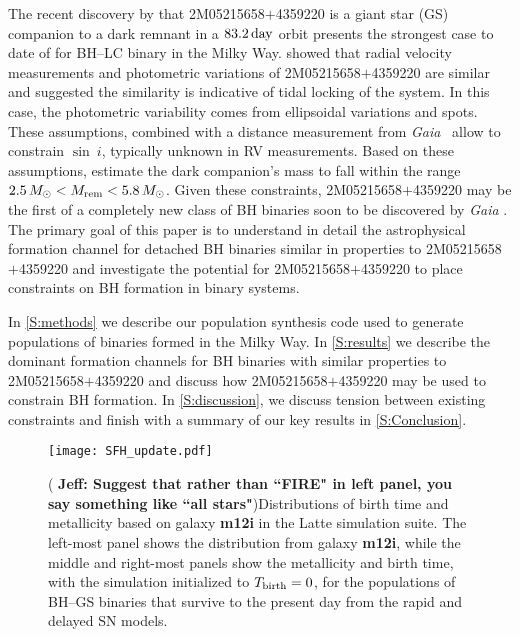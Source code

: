 \documentclass[twocolumn,tighten]{aastex61}
\newcommand{\msun}{{M_\odot}}
\newcommand{\gaia}{{\it Gaia} }
\newcommand{\days}{\rm{day}}
\newcommand{\jeff}[1]{\textbf{\color{teal} Jeff: #1}}
\begin{document}
The recent discovery by \citet{Thompson2018} that 2M05215658$+$4359220 is a giant star (GS) companion to a dark remnant in a $83.2\,\days$ orbit presents the strongest case to date of for BH--LC binary in the Milky Way. \citet{Thompson2018} showed that radial velocity measurements and photometric variations of 2M05215658$+$4359220 are similar and suggested the similarity is indicative of tidal locking of the system. In this case, the photometric variability comes from ellipsoidal variations and spots. These assumptions, combined with a distance measurement from \gaia\ allow \citet{Thompson2018} to constrain $\sin\ i$, typically unknown in RV measurements. Based on these assumptions, \citet{Thompson2018} estimate the dark companion's mass to fall within the range $2.5\,\msun<M_{\rm{rem}}<5.8\,\msun$. Given these constraints, 2M05215658$+$4359220 may be the first of a completely new class of BH binaries soon to be discovered by \gaia. The primary goal of this paper is to understand in detail the astrophysical formation channel for detached BH binaries similar in properties to 2M05215658$+$4359220 and investigate the potential for 2M05215658$+$4359220 to place constraints on BH formation in binary systems.

In \autoref{S:methods} we describe our population synthesis code used to generate populations of binaries formed in the Milky Way. In \autoref{S:results} we describe the dominant formation channels for BH binaries with similar properties to 2M05215658$+$4359220 and discuss how 2M05215658$+$4359220 may be used to constrain BH formation. In \autoref{S:discussion}, we discuss tension between existing constraints and finish with a summary of our key results in \autoref{S:Conclusion}.

\begin{figure*}
    \centering
    \texttt{[image: SFH\_update.pdf]}
    \caption{(\jeff{Suggest that rather than ``FIRE" in left panel, you say something like ``all stars"})Distributions of birth time and metallicity based on galaxy {\bf{m12i}} in the Latte simulation suite. The left-most panel shows the distribution from galaxy {\bf{m12i}}, while the middle and right-most panels show the metallicity and birth time, with the simulation initialized to $T_{\rm{birth}}=0$, for the populations of BH--GS binaries that survive to the present day from the rapid and delayed SN models.}
    \label{fig:SFH}
\end{figure*}
\end{document}
